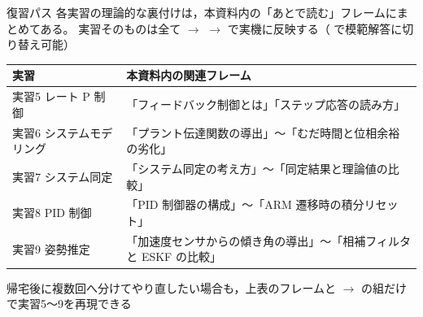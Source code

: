 \begin{frame}{復習パス}
  {\footnotesize 各実習の理論的な裏付けは，本資料内の「あとで読む」フレームにまとめてある。
  実習そのものは全て  $\to$  $\to$
   で実機に反映する（ で模範解答に切り替え可能）}

  \begin{center}\footnotesize
    \renewcommand{\arraystretch}{0.92}%
    \begin{tabular}{l >{\raggedright\arraybackslash}p{85mm}}
      \hline
      \textbf{実習} & \textbf{本資料内の関連フレーム} \\
      \hline
      実習5 レート P 制御       & 「フィードバック制御とは」「ステップ応答の読み方」 \\
      実習6 システムモデリング  & 「プラント伝達関数の導出」〜「むだ時間と位相余裕の劣化」 \\
      実習7 システム同定        & 「システム同定の考え方」〜「同定結果と理論値の比較」 \\
      実習8 PID 制御            & 「PID 制御器の構成」〜「ARM 遷移時の積分リセット」 \\
      実習9 姿勢推定            & 「加速度センサからの傾き角の導出」〜「相補フィルタと ESKF の比較」 \\
      \hline
    \end{tabular}
  \end{center}

  {\scriptsize 帰宅後に複数回へ分けてやり直したい場合も，上表のフレームと
   $\to$  の組だけで実習5〜9を再現できる}
\end{frame}

